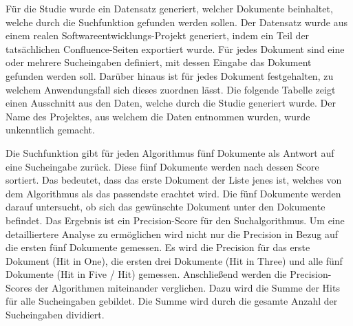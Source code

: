 Für die Studie wurde ein Datensatz generiert, welcher Dokumente beinhaltet, welche durch die Suchfunktion gefunden werden sollen.
Der Datensatz wurde aus einem realen Softwareentwicklungs-Projekt generiert, indem ein Teil der tatsächlichen Confluence-Seiten exportiert wurde.
Für jedes Dokument sind eine oder mehrere Sucheingaben definiert, mit dessen Eingabe das Dokument gefunden werden soll.
Darüber hinaus ist für jedes Dokument festgehalten, zu welchem Anwendungsfall sich dieses zuordnen lässt.
Die folgende Tabelle zeigt einen Ausschnitt aus den Daten, welche durch die Studie generiert wurde.
Der Name des Projektes, aus welchem die Daten entnommen wurden, wurde unkenntlich gemacht.\\

\begin{table}[!ht]
    \centering
\end{table}

\begin{table}[!ht]
    \centering
\end{table}

Die Suchfunktion gibt für jeden Algorithmus fünf Dokumente als Antwort auf eine Sucheingabe zurück.
Diese fünf Dokumente werden nach dessen Score sortiert.
Das bedeutet, dass das erste Dokument der Liste jenes ist, welches von dem Algorithmus als das passendste erachtet wird.
Die fünf Dokumente werden darauf untersucht, ob sich das gewünschte Dokument unter den Dokumente befindet.
Das Ergebnis ist ein Precision-Score für den Suchalgorithmus.
Um eine detailliertere Analyse zu ermöglichen wird nicht nur die Precision in Bezug auf die ersten fünf Dokumente gemessen.
Es wird die Precision für das erste Dokument (Hit in One), die ersten drei Dokumente (Hit in Three) und alle fünf Dokumente (Hit in Five / Hit) gemessen.
Anschließend werden die Precision-Scores der Algorithmen miteinander verglichen.
Dazu wird die Summe der Hits für alle Sucheingaben gebildet.
Die Summe wird durch die gesamte Anzahl der Sucheingaben dividiert.\\

